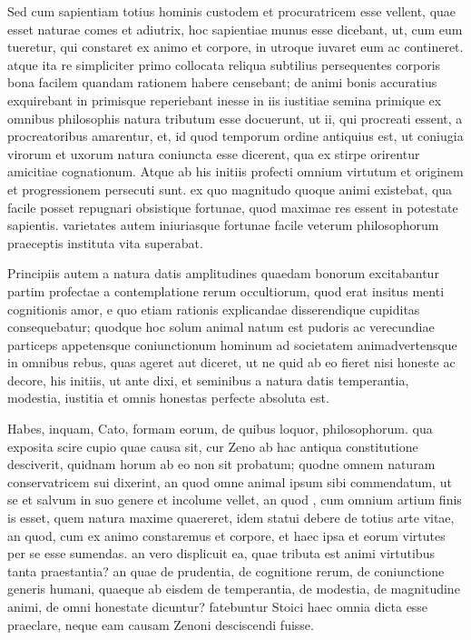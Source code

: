  Sed cum sapientiam totius hominis custodem et procuratricem esse vellent, quae esset naturae comes et adiutrix, hoc sapientiae munus esse dicebant, ut, cum eum tueretur, qui constaret ex animo et corpore, in utroque iuvaret eum ac contineret. atque ita re simpliciter primo collocata reliqua subtilius persequentes corporis bona facilem quandam rationem habere censebant; de animi bonis accuratius exquirebant in primisque reperiebant inesse in iis iustitiae semina primique ex omnibus philosophis natura tributum esse docuerunt, ut ii, qui procreati essent, a procreatoribus amarentur, et, id quod temporum ordine antiquius est, ut coniugia virorum et uxorum natura coniuncta esse dicerent, qua ex stirpe orirentur amicitiae cognationum. Atque ab his initiis profecti omnium virtutum et originem et progressionem persecuti sunt. ex quo magnitudo quoque animi existebat, qua facile posset repugnari obsistique fortunae, quod maximae res essent in potestate sapientis. varietates autem iniuriasque fortunae facile veterum philosophorum praeceptis instituta vita superabat.

 Principiis autem a natura datis amplitudines quaedam bonorum excitabantur partim profectae a contemplatione rerum occultiorum, quod erat insitus menti cognitionis amor, e quo etiam rationis explicandae disserendique cupiditas consequebatur; quodque hoc solum animal natum est pudoris ac verecundiae particeps appetensque coniunctionum hominum ad societatem animadvertensque in omnibus rebus, quas ageret aut diceret, ut ne quid ab eo fieret nisi honeste ac decore, his initiis, ut ante dixi, et seminibus a natura datis temperantia, modestia, iustitia et omnis honestas perfecte absoluta est.

 Habes, inquam, Cato, formam eorum, de quibus loquor, philosophorum. qua exposita scire cupio quae causa sit, cur Zeno ab hac antiqua constitutione desciverit, quidnam horum ab eo non sit probatum; quodne omnem naturam conservatricem sui dixerint, an quod omne animal ipsum sibi commendatum, ut se et salvum in suo genere et incolume vellet, an quod , cum omnium artium finis is esset, quem natura maxime quaereret, idem statui debere de totius arte vitae, an quod, cum ex animo constaremus et corpore, et haec ipsa et eorum virtutes per se esse sumendas. an vero displicuit ea, quae tributa est animi virtutibus tanta praestantia? an quae de prudentia, de cognitione rerum, de coniunctione generis humani, quaeque ab eisdem de temperantia, de modestia, de magnitudine animi, de omni honestate dicuntur? fatebuntur Stoici haec omnia dicta esse praeclare, neque eam causam Zenoni desciscendi fuisse.

